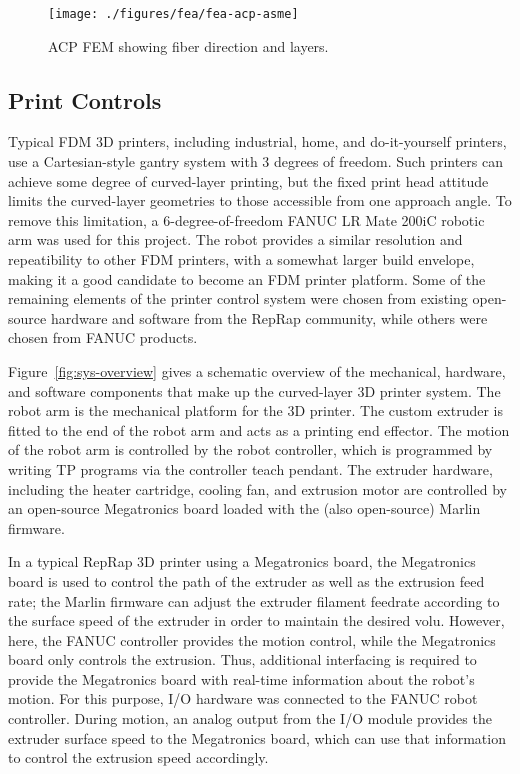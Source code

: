 \begin{figure}[htp]
\centering
\texttt{[image: ./figures/fea/fea-acp-asme]}
\caption{ACP FEM showing fiber direction and layers.}
\label{fig:fea-acp-asme}
\end{figure}


\subsection*{Print Controls}

Typical FDM 3D printers, including industrial, home, and do-it-yourself printers, use a Cartesian-style gantry system with 3 degrees of freedom. Such printers can achieve some degree of curved-layer printing, but the fixed print head attitude limits the curved-layer geometries to those accessible from one approach angle. To remove this limitation, a 6-degree-of-freedom FANUC LR Mate 200iC robotic arm was used for this project. The robot provides a similar resolution and repeatibility to other FDM printers, with a somewhat larger build envelope, making it a good candidate to become an FDM printer platform. Some of the remaining elements of the printer control system were chosen from existing open-source hardware and software from the RepRap community, while others were chosen from FANUC products.

Figure~\ref{fig:sys-overview} gives a schematic overview of the mechanical, hardware, and software components that make up the curved-layer 3D printer system. The robot arm is the mechanical platform for the 3D printer. The custom extruder is fitted to the end of the robot arm and acts as a printing end effector. The motion of the robot arm is controlled by the robot controller, which is programmed by writing TP programs via the controller teach pendant. The extruder hardware, including the heater cartridge, cooling fan, and extrusion motor are controlled by an open-source Megatronics board loaded with the (also open-source) Marlin firmware. 

In a typical RepRap 3D printer using a Megatronics board, the Megatronics board is used to control the path of the extruder as well as the extrusion feed rate; the Marlin firmware can adjust the extruder filament feedrate according to the surface speed of the extruder in order to maintain the desired volu. However, here, the FANUC controller provides the motion control, while the Megatronics board only controls the extrusion. Thus, additional interfacing is required to provide the Megatronics board with real-time information about the robot's motion. For this purpose, I/O hardware was connected to the FANUC robot controller. During motion, an analog output from the I/O module provides the extruder surface speed to the Megatronics board, which can use that information to control the extrusion speed accordingly.

